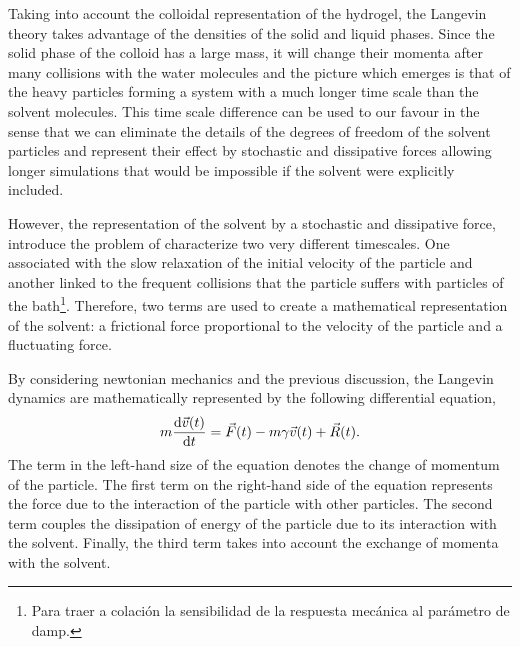 
Taking into account the colloidal representation of the hydrogel, the Langevin theory takes advantage of the densities of the solid and liquid phases.
Since the solid phase of the colloid has a large mass, it will change their momenta after many collisions with the water molecules and the picture which emerges is that of the heavy particles forming a system with a much longer time scale than the solvent molecules\citep{Thijssen2007}.
This time scale difference can be used to our favour in the sense that we can eliminate the details of the degrees of freedom of the solvent particles and represent their effect by stochastic and dissipative forces allowing longer simulations that would be impossible if the solvent were explicitly included\citep{pastorTechniquesApplicationsLangevin1994}.

However, the representation of the solvent by a stochastic and dissipative force, introduce the problem of characterize two very different timescales.
One associated with the slow relaxation of the initial velocity of the particle and another linked to the frequent collisions that the particle suffers with particles of the bath\citep{tsl2006}\footnote{Para traer a colación la sensibilidad de la respuesta mecánica al parámetro de damp.}. 
Therefore, two terms are used to create a mathematical representation of the solvent: a frictional force proportional to the velocity of the particle and a fluctuating force. 

By considering newtonian mechanics and the previous discussion, the Langevin dynamics are mathematically represented by the following differential equation,
\begin{gather}
    m\dv{\vec{v}(t)}{t}=\vec{F}(t)-m\gamma\vec{v}(t)+\vec{R}(t).\label{eqn:BrownianDyn1}
\end{gather}
The term in the left-hand size of the equation denotes the change of momentum of the particle.
The first term on the right-hand side of the equation represents the force due to the interaction of the particle with other particles.
The second term couples the dissipation of energy of the particle due to its interaction with the solvent.
Finally, the third term takes into account the exchange of momenta with the solvent.

